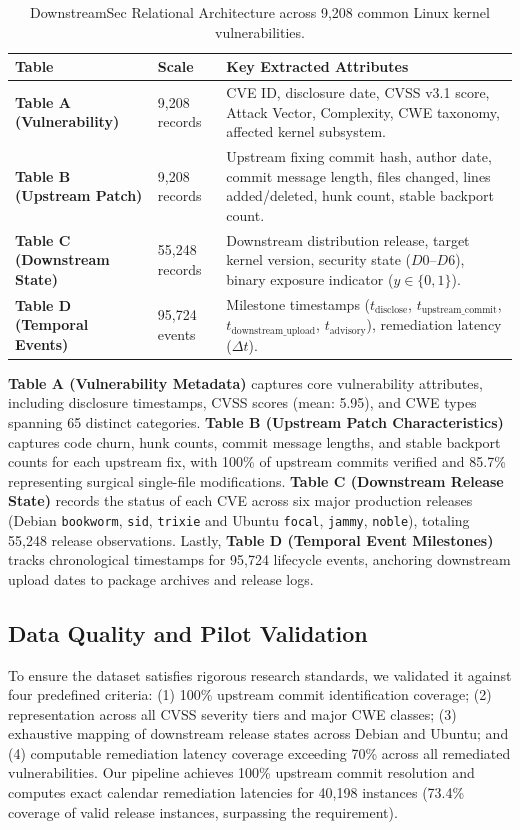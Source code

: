 \documentclass[final,5p,times,twocolumn]{elsarticle}
\begin{document}
\begin{table}[t]
\centering
\caption{DownstreamSec Relational Architecture across 9,208 common Linux kernel vulnerabilities.}
\label{tab:schema}
\small
\begin{tabularx}{\textwidth}{llX}
\toprule
\textbf{Table} & \textbf{Scale} & \textbf{Key Extracted Attributes} \\
\midrule
\textbf{Table A (Vulnerability)} & 9,208 records & CVE ID, disclosure date, CVSS v3.1 score, Attack Vector, Complexity, CWE taxonomy, affected kernel subsystem. \\
\textbf{Table B (Upstream Patch)} & 9,208 records & Upstream fixing commit hash, author date, commit message length, files changed, lines added/deleted, hunk count, stable backport count. \\
\textbf{Table C (Downstream State)} & 55,248 records & Downstream distribution release, target kernel version, security state ($D0$--$D6$), binary exposure indicator ($y \in \{0, 1\}$). \\
\textbf{Table D (Temporal Events)} & 95,724 events & Milestone timestamps ($t_{\text{disclose}}$, $t_{\text{upstream\_commit}}$, $t_{\text{downstream\_upload}}$, $t_{\text{advisory}}$), remediation latency ($\Delta t$). \\
\bottomrule
\end{tabularx}
\end{table}

\textbf{Table A (Vulnerability Metadata)} captures core vulnerability attributes, including disclosure timestamps, CVSS scores (mean: 5.95), and CWE types spanning 65 distinct categories. \textbf{Table B (Upstream Patch Characteristics)} captures code churn, hunk counts, commit message lengths, and stable backport counts for each upstream fix, with 100\% of upstream commits verified and 85.7\% representing surgical single-file modifications. \textbf{Table C (Downstream Release State)} records the status of each CVE across six major production releases (Debian \texttt{bookworm}, \texttt{sid}, \texttt{trixie} and Ubuntu \texttt{focal}, \texttt{jammy}, \texttt{noble}), totaling 55,248 release observations. Lastly, \textbf{Table D (Temporal Event Milestones)} tracks chronological timestamps for 95,724 lifecycle events, anchoring downstream upload dates to package archives and release logs.

\subsection{Data Quality and Pilot Validation}
To ensure the dataset satisfies rigorous research standards, we validated it against four predefined criteria: (1) 100\% upstream commit identification coverage; (2) representation across all CVSS severity tiers and major CWE classes; (3) exhaustive mapping of downstream release states across Debian and Ubuntu; and (4) computable remediation latency coverage exceeding 70\% across all remediated vulnerabilities. Our pipeline achieves 100\% upstream commit resolution and computes exact calendar remediation latencies for 40,198 instances (73.4\% coverage of valid release instances, surpassing the requirement).
\end{document}
